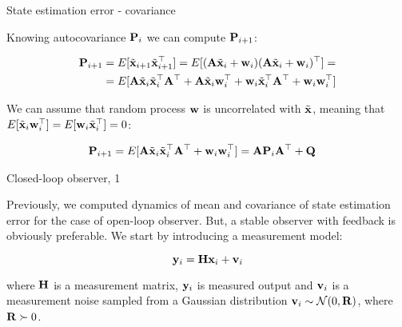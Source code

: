 \documentclass{beamer}
\begin{document}
\begin{frame}{State estimation error - covariance}
	\begin{flushleft}
		
		Knowing autocovariance $\mathbf{P}_i$ we can compute $\mathbf{P}_{i+1}$:
		
		\begin{align*}
			\mathbf{P}_{i+1} &= E[\Tilde{\mathbf{x}}_{i+1}\Tilde{\mathbf{x}}_{i+1}^\top] = 
			E[(\mathbf{A} \Tilde{\mathbf{x}}_i + \mathbf{w}_i) (\mathbf{A} \Tilde{\mathbf{x}}_i + \mathbf{w}_i)^\top] = 
			\\
			&=
			E[\mathbf{A} \Tilde{\mathbf{x}}_i \Tilde{\mathbf{x}}_i^\top \mathbf{A}^\top +
			\mathbf{A} \Tilde{\mathbf{x}}_i \mathbf{w}_i^\top + 
			\mathbf{w}_i \Tilde{\mathbf{x}}_i^\top \mathbf{A}^\top +
			\mathbf{w}_i \mathbf{w}_i^\top]
		\end{align*}
		
		We can assume that random process $\mathbf{w}$ is uncorrelated with $\Tilde{\mathbf{x}}$, meaning that $E[\Tilde{\mathbf{x}}_i \mathbf{w}_i^\top] = E[\mathbf{w}_i \Tilde{\mathbf{x}}_i^\top] = 0$:
		
		\begin{align*}
			\mathbf{P}_{i+1} 
			&=
			E[\mathbf{A} \Tilde{\mathbf{x}}_i \Tilde{\mathbf{x}}_i^\top \mathbf{A}^\top +
			\mathbf{w}_i \mathbf{w}_i^\top] 
			= 
			\mathbf{A} \mathbf{P}_i \mathbf{A}^\top +
			\mathbf{Q}
		\end{align*}
		
		
	\end{flushleft}
\end{frame}



\begin{frame}{Closed-loop observer, 1}
	\begin{flushleft}
		
		Previously, we computed dynamics of mean and covariance of state estimation error for the case of open-loop observer. But, a stable observer with feedback is obviously preferable. We start by introducing a measurement model:
		
		\begin{equation}
			\mathbf{y}_i = \mathbf{H} \mathbf{x}_i + \mathbf{v}_i
		\end{equation}
		
		where $\mathbf{H}$ is a measurement matrix, $\mathbf{y}_i$ is measured output and $\mathbf{v}_i$ is a measurement noise sampled from a Gaussian distribution $\mathbf{v}_i \sim \mathcal{N} (0, \mathbf{R})$, where $\mathbf{R} \succ 0$.
		
	\end{flushleft}
\end{frame}
\end{document}

